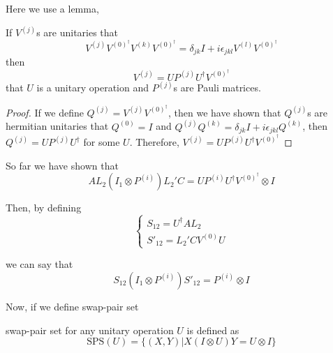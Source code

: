 Here we use a lemma,
\begin{lemma}
  If $V^{(j)}$s are unitaries that
  \begin{equation}
    V^{(j)} V^{(0)^\dagger} V^{(k)} V^{(0)^\dagger} = \delta_{jk}I + i\epsilon_{jkl} V^{(l)} V^{(0)^\dagger}
  \end{equation}
  then 
  \begin{equation}
    V^{(j)} = U P^{(j)} U^\dagger V^{(0)^\dagger}
  \end{equation}
  that $U$ is a unitary operation and $P^{(j)}$s are Pauli matrices.
\end{lemma}
\begin{proof}
  If we define $Q^{(j)} = V^{(j)} V^{(0)^\dagger}$, then we have shown that $Q^{(j)}$s are hermitian unitaries that $Q^{(0)} = I$ and $Q^{(j)}Q^{(k)} = \delta_{jk}I + i\epsilon_{jkl} Q^{(k)}$, then $Q^{(j)} = U P^{(j)} U^\dagger$ for some $U$.
  Therefore, $V^{(j)} = U P^{(j)} U^\dagger V^{(0)^\dagger}$
\end{proof}


So far we have shown that
\begin{equation}
  AL_2 (I_1 \otimes P^{(i)}) L_2' C = U P^{(i)} U^\dagger V^{(0)^\dagger} \otimes I
\end{equation}

Then, by defining 
\begin{equation}
  \begin{cases} S_{12} = U^\dagger AL_2 \\
    S'_{12} = L_2' C V^{(0)} U
  \end{cases}
\end{equation}

we can say that
\begin{equation}
  S_{12} (I_1 \otimes P^{(i)}) S'_{12} = P^{(i)} \otimes I
\end{equation}


Now, if we define swap-pair set

\begin{definition}
  swap-pair set for any unitary operation $U$ is defined as
  \begin{equation}
    \mathrm{SPS}(U) = \{ (X, Y) | X(I \otimes U)Y = U \otimes I \}
  \end{equation}
\end{definition}



